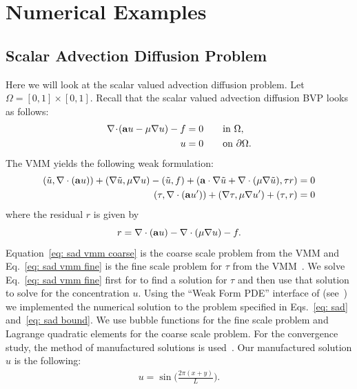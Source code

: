 \chapter{Numerical Examples}
\section{Scalar Advection Diffusion Problem}
Here we will look at the scalar valued advection diffusion problem. Let  $\Omega=[0,1]\times[0,1]$. Recall that the scalar valued advection diffusion BVP looks as follows:
\begin{alignat}{2}
    \label{eq: sad}
    \Div{(\bv{a} u - \mu\Grad{u})}-f &= 0 \quad & &\text{in $\Omega$,}
    \\
    \label{eq: sad bound}
    u &= 0 \quad & &\text{on $\partial\Omega$}.
\end{alignat}
The \ac{VMM} yields the following weak formulation: 
\begin{align}
    \label{eq: sad vmm coarse}
    (\tilde{u},\nabla\cdot(\boldsymbol{\mathbf{a}} u)) + (\nabla\tilde{u},\mu\nabla u) - (\tilde{u}, f) + (\boldsymbol{\mathbf{a}}\cdot\nabla\tilde{u} + \nabla\cdot(\mu\nabla\tilde{u}),\tau r) &= 0
    \\
    \label{eq: sad vmm fine}
    (\tau,\nabla\cdot(\boldsymbol{\mathbf{a}} u')) + (\nabla\tau,\mu\nabla u') + (\tau,r) &= 0
\end{align}
where the residual $r$ is given by 
\begin{equation}
    r = \nabla\cdot(\boldsymbol{\mathbf{a}} u) - \nabla\cdot(\mu\nabla u) - f.
\end{equation}
Equation~\eqref{eq: sad vmm coarse} is the coarse scale problem from the \ac{VMM} and Eq.~\eqref{eq: sad vmm fine} is the fine scale problem for $\tau$ from the \ac{VMM}~\cite{masud2004multiscale}.  We solve Eq.~\eqref{eq: sad vmm fine} first for to find a solution for $\tau$ and then use that solution to solve for the concentration $u$.
Using the ``Weak Form PDE'' interface of \comsol (see~\cite{comsol5.3}) we implemented the numerical solution to the problem specified in Eqs.~\eqref{eq: sad} and~\eqref{eq: sad bound}. We use bubble functions for the fine scale problem and Lagrange quadratic elements for the coarse scale problem. For the convergence study, the method of manufactured solutions is used~\cite{salari2000-MMS}. Our manufactured solution $u$ is the following:
\begin{align}
    \label{eq: sad msu}
    u = \sin\Big(\frac{2\pi(x+y)}{L}\Big).
\end{align}
